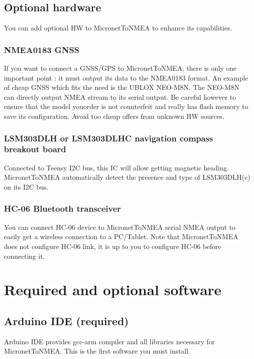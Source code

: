 \documentclass{report}
\begin{document}
\section{Optional hardware}

You can add optional HW to MicronetToNMEA to enhance its capabilities.

\subsection{NMEA0183 GNSS}

If you want to connect a GNSS/GPS to MicronetToNMEA, there is only one important point : it must output its data to the NMEA0183 format. An example of cheap GNSS which fits the need is the UBLOX NEO-M8N. The NEO-M8N can directly output NMEA stream to its serial output. Be careful however to ensure that the model youorder is not counterfeit and really has flash memory to save its configuration. Avoid too cheap offers from unknown HW sources.

\subsection{LSM303DLH or LSM303DLHC navigation compass breakout board}

Connected to Teensy I2C bus, this IC will allow getting magnetic heading. MicronetToNMEA automatically detect the presence and type of LSM303DLH(c) on its I2C bus.

\subsection{HC-06 Bluetooth transceiver}

You can connect HC-06 device to MicronetToNMEA serial NMEA output to easily get a wireless connection to a PC/Tablet. Note that MicronetToNMEA does not configure HC-06 link, it is up to you to configure HC-06 before connecting it.

\chapter{Required and optional software}

\section{Arduino IDE (required)}
Arduino IDE provides gcc-arm compiler and all libraries necessary for MicronetToNMEA. This is the first software you must install.
\end{document}

